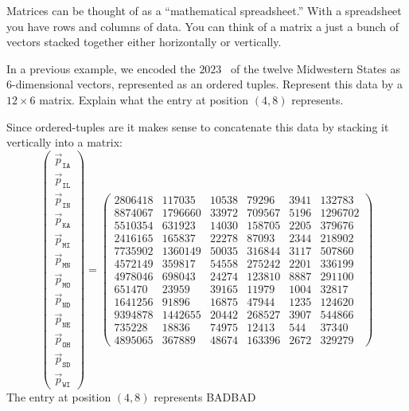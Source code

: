 \documentclass{ximera}
\begin{document}
Matrices can be thought of as a ``mathematical spreadsheet.'' With a
spreadsheet you have rows and columns of data.  You can think of a
matrix a just a bunch of vectors stacked together either horizontally
or vertically.

\begin{example} %
  In a previous example, we encoded the $2023$
  ~of
  the twelve Midwestern States as $6$-dimensional vectors, represented
  as an ordered tuples. Represent this data by a $12\times 6$
  matrix. Explain what the entry at position $(4,8)$ represents.
  \begin{explanation}
  Since ordered-tuples are  it makes sense to
  concatenate this data by stacking it vertically into a matrix:
  \[
  \begin{pmatrix}
  \vec{p}_{\texttt{IA}} \\
  \vec{p}_{\texttt{IL}} \\
  \vec{p}_{\texttt{IN}} \\
  \vec{p}_{\texttt{KA}} \\
  \vec{p}_{\texttt{MI}} \\
  \vec{p}_{\texttt{MN}} \\
  \vec{p}_{\texttt{MO}} \\
  \vec{p}_{\texttt{ND}} \\
  \vec{p}_{\texttt{NE}} \\
  \vec{p}_{\texttt{OH}} \\
  \vec{p}_{\texttt{SD}} \\
  \vec{p}_{\texttt{WI}}
  \end{pmatrix}
  =
  \begin{pmatrix}
  2806418 & 117035 & 10538 & 79296 & 3941 & 132783\\
  8874067 & 1796660 & 33972 & 709567 & 5196 & 1296702\\
  5510354 & 631923 & 14030 & 158705 & 2205 & 379676\\
  2416165 & 165837 & 22278 & 87093 & 2344 & 218902\\
  7735902 & 1360149 & 50035 & 316844 & 3117 & 507860\\
  4572149 & 359817 & 54558 & 275242 & 2201 & 336199\\
  4978046 & 698043 & 24274 & 123810 & 8887 & 291100\\
  651470 & 23959 & 39165 & 11979 & 1004 & 32817\\
  1641256 & 91896 & 16875 & 47944 & 1235 & 124620\\
  9394878 & 1442655 & 20442 & 268527 & 3907 & 544866\\
  735228 & 18836 & 74975 & 12413 & 544 & 37340\\
  4895065 & 367889 & 48674 & 163396 & 2672 & 329279
  \end{pmatrix}
  \]
  The entry at position $(4,8)$ represents BADBAD
  \end{explanation}
\end{example}
\end{document}
